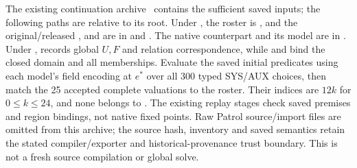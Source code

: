 The existing continuation archive~\cite{continuationartifact} contains
the sufficient saved inputs; the following paths are relative to its root.
Under , the roster is
, and the original/released
,  and 
are in  and .
The native counterpart  and its model are in
.
Under , 
records global $U,F$ and relation correspondence, while
 and
 bind the closed domain and
all memberships. Evaluate the saved initial predicates using each model's
field encoding at $e^*$ over all 300 typed SYS/AUX choices, then match
the 25 accepted complete valuations to the roster. Their indices are
$12k$ for $0\le k\le24$, and none belongs to .
The existing  replay stages check saved premises and
region bindings, not native fixed points. Raw Patrol source/import files
are omitted from this archive; the source hash, inventory and saved
semantics retain the stated compiler/exporter and historical-provenance
trust boundary. This is not a fresh source compilation or global solve.
